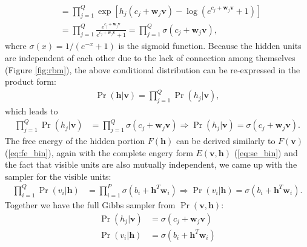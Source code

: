 \documentclass[11pt]{article}
\newcommand{\vh}{\boldsymbol{h}}
\newcommand{\vv}{\boldsymbol{v}}
\newcommand{\vw}{\boldsymbol{w}}
\begin{document}
{\begin{align*}
               &= \prod_{j=1}^Q{\exp\left[ h_j(c_j+\vw_j\vv) - \log{(e^{c_j+\vw_j\vv}+1)} \right]} \\
               &= \prod_{j=1}^Q{   \frac{e^{c_j+\vw_j\vv}}{e^{c_j+\vw_j\vv}+1}} = \prod_{j=1}^Q{\sigma(c_j+\vw_j\vv)},
\end{align*}
where $\sigma(x)=1/(e^{-x}+1)$ is the sigmoid function. Because the hidden units are independent of each other due to the lack of connection among themselves (Figure \ref{fig:rbm}), the above conditional distribution can be re-expressed in the product form:
\begin{align*}
  \Pr(\vh|\vv) = \prod_{j=1}^Q{\Pr(h_j|\vv)},
\end{align*}
which leads to
\begin{align*}
  \prod_{j=1}^Q{\Pr(h_j|\vv)} &= \prod_{j=1}^Q{\sigma(c_j+\vw_j\vv)} \Rightarrow \Pr(h_j|\vv) = \sigma(c_j+\vw_j\vv).
\end{align*}
The free energy of the hidden portion $F(\vh)$ can be derived similarly to $F(\vv)$ (\ref{eq:fe_bin}), again with the complete engery form $E(\vv, \vh)$ (\ref{eq:se_bin}) and the fact that visible units are also mutually independent, we came up with the sampler for the visible units:
\begin{align*}
  \prod_{i=1}^Q{\Pr(v_i|\vh)} &= \prod_{i=1}^P{\sigma(b_i+\vh^T\vw_i)} \Rightarrow \Pr(v_i|\vh) = \sigma(b_i+\vh^T\vw_i).
\end{align*}
Together we have the full Gibbs sampler from $\Pr(\vv, \vh)$:
\begin{align*}
  \Pr(h_j|\vv) &= \sigma(c_j+\vw_j\vv) \\
  \Pr(v_i|\vh) &= \sigma(b_i+\vh^T\vw_i)
\end{align*}
% 
}
\end{document}
